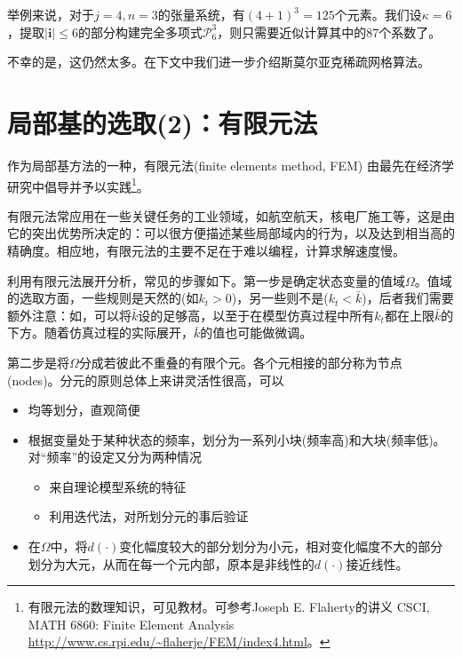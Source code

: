 举例来说，对于$j=4,n=3$的张量系统，有$(4+1)^3=125$个元素。我们设$\kappa = 6$，提取$\left| \bm{i} \right| \le 6$的部分构建完全多项式$\mathcal{P}_6^3$，则只需要近似计算其中的87个系数了。

不幸的是，这仍然太多。在下文中我们进一步介绍斯莫尔亚克稀疏网格算法。

\section{局部基的选取(2)：有限元法}
\label{sec:pj-fem}

作为局部基方法的一种，有限元法(finite elements method, FEM) 由\cite{McGrattan:1996gu}最先在经济学研究中倡导并予以实践\footnote{有限元法的数理知识，可见教材\cite{Hughes:2000ve, Brenner:2008hf}。可参考Joseph E. Flaherty的讲义 CSCI, MATH 6860: Finite Element Analysis \url{http://www.cs.rpi.edu/~flaherje/FEM/index4.html}。}。

有限元法常应用在一些关键任务的工业领域，如航空航天，核电厂施工等，这是由它的突出优势所决定的：可以很方便描述某些局部域内的行为，以及达到相当高的精确度。相应地，有限元法的主要不足在于难以编程，计算求解速度慢。

利用有限元法展开分析，常见的步骤如下。第一步是确定状态变量的值域$\Omega$。值域的选取方面，一些规则是天然的(如$k_t > 0$)，另一些则不是($k_t < \bar{k}$)，后者我们需要额外注意：如，可以将$\bar{k}$设的足够高，以至于在模型仿真过程中所有$k_t$都在上限$\bar{k}$的下方。随着仿真过程的实际展开，$\bar{k}$的值也可能做微调。

第二步是将$\Omega$分成若彼此不重叠的有限个元。各个元相接的部分称为节点(nodes)。分元的原则总体上来讲灵活性很高，可以
\begin{itemize}
  \item 均等划分，直观简便
  \item 根据变量处于某种状态的频率，划分为一系列小块(频率高)和大块(频率低)。对``频率''的设定又分为两种情况
  \begin{itemize}
    \item 来自理论模型系统的特征
    \item 利用迭代法，对所划分元的事后验证
  \end{itemize}
  \item 在$\Omega$中，将$d(\cdot)$变化幅度较大的部分划分为小元，相对变化幅度不大的部分划分为大元，从而在每一个元内部，原本是非线性的$d(\cdot)$接近线性。
\end{itemize}

